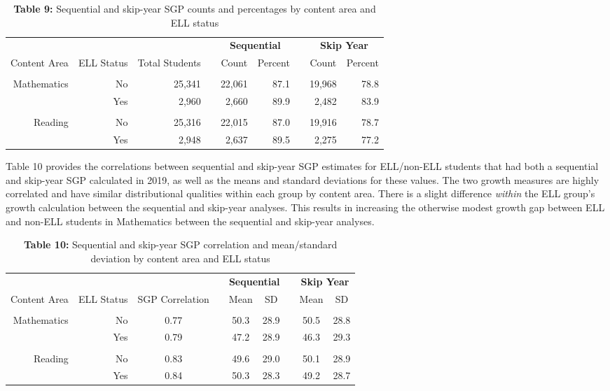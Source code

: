 \documentclass[12pt]{article}
\begin{document}
\begin{table}[H]
\caption*{\textbf{Table 9:} Sequential and skip-year SGP counts and percentages by content area and ELL status\label{table9}} 
\begin{center}
\begin{tabular}{rrrcrrcrr}
\hline\hline
\multicolumn{3}{c}{\bfseries }&\multicolumn{1}{c}{\bfseries }&\multicolumn{2}{c}{\bfseries Sequential}&\multicolumn{1}{c}{\bfseries }&\multicolumn{2}{c}{\bfseries Skip Year}\tabularnewline
\cline{5-6} \cline{8-9}
\multicolumn{1}{c}{Content Area}&\multicolumn{1}{c}{ELL Status}&\multicolumn{1}{c}{Total Students}&\multicolumn{1}{c}{}&\multicolumn{1}{c}{Count}&\multicolumn{1}{c}{Percent}&\multicolumn{1}{c}{}&\multicolumn{1}{c}{Count}&\multicolumn{1}{c}{Percent}\tabularnewline
\hline
&&&&&&&&\tabularnewline
Mathematics&No&25,341&&22,061&87.1&&19,968&78.8\tabularnewline
&Yes&2,960&&2,660&89.9&&2,482&83.9\tabularnewline
\hline
&&&&&&&&\tabularnewline
Reading&No&25,316&&22,015&87.0&&19,916&78.7\tabularnewline
&Yes&2,948&&2,637&89.5&&2,275&77.2\tabularnewline
\hline
\end{tabular}\end{center}
\end{table}

Table 10 provides the correlations between sequential and skip-year SGP
estimates for ELL/non-ELL students that had both a sequential and
skip-year SGP calculated in 2019, as well as the means and standard
deviations for these values. The two growth measures are highly
correlated and have similar distributional qualities within each group
by content area. There is a slight difference \emph{within} the ELL
group's growth calculation between the sequential and skip-year
analyses. This results in increasing the otherwise modest growth gap
between ELL and non-ELL students in Mathematics between the sequential
and skip-year analyses.

\begin{table}[H]
\caption*{\textbf{Table 10:} Sequential and skip-year SGP correlation and mean/standard deviation by content area and ELL status\label{table10}} 
\begin{center}
\begin{tabular}{rrccccccc}
\hline\hline
\multicolumn{3}{c}{\bfseries }&\multicolumn{1}{c}{\bfseries }&\multicolumn{2}{c}{\bfseries Sequential}&\multicolumn{1}{c}{\bfseries }&\multicolumn{2}{c}{\bfseries Skip Year}\tabularnewline
\cline{5-6} \cline{8-9}
\multicolumn{1}{c}{Content Area}&\multicolumn{1}{c}{ELL Status}&\multicolumn{1}{c}{SGP Correlation}&\multicolumn{1}{c}{}&\multicolumn{1}{c}{Mean}&\multicolumn{1}{c}{SD}&\multicolumn{1}{c}{}&\multicolumn{1}{c}{Mean}&\multicolumn{1}{c}{SD}\tabularnewline
\hline
&&&&&&&&\tabularnewline
Mathematics&No&0.77&&50.3&28.9&&50.5&28.8\tabularnewline
&Yes&0.79&&47.2&28.9&&46.3&29.3\tabularnewline
\hline
&&&&&&&&\tabularnewline
Reading&No&0.83&&49.6&29.0&&50.1&28.9\tabularnewline
&Yes&0.84&&50.3&28.3&&49.2&28.7\tabularnewline
\hline
\end{tabular}\end{center}
\end{table}
\end{document}
